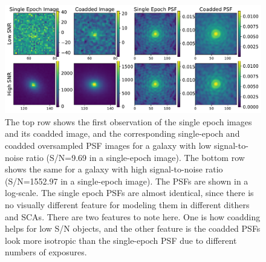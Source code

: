 \documentclass[fleqn,usenatbib]{mnras}
\begin{document}
\begin{figure}
	\includegraphics[width=\textwidth]{lowsnr_highsnr_galaxies.pdf}
    \caption{The top row shows the first observation of the single epoch images and its coadded image, and the corresponding single-epoch and coadded oversampled PSF images for a galaxy with low signal-to-noise ratio (S/N=9.69 in a single-epoch image). The bottom row shows the same for a galaxy with high signal-to-noise ratio (S/N=1552.97 in a single-epoch image). The PSFs are shown in a log-scale. The single epoch PSFs are almost identical, since there is no visually different feature for modeling them in different dithers and SCAs. There are two features to note here. One is how coadding helps for low S/N objects, and the other feature is the coadded PSFs look more isotropic than the single-epoch PSF due to different numbers of exposures.}
    \label{fig:singlecoadd}
\end{figure}
\end{document}
